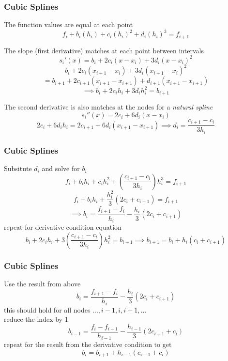 \documentclass[fleqn]{beamer} %
\newcommand{\sectionIIIsubsectionIVtitle}{Cubic Splines}
\begin{document}
			\begin{frame}
				\frametitle{\sectionIIIsubsectionIVtitle} \small
				\bigskip
        
        The function values are equal at each point
        \[f_i+b_i\left(h_i\right)+c_i\left(h_i\right)^2+d_i\left(h_i\right)^3=f_{i+1}\]
      
        The slope (first derivative) matches at each point between intervals 
        \[s_i'\left(x\right)=b_i+2c_i\left(x-x_i\right)+3d_i\left(x-x_i\right)^2\]
        \[b_i+2c_i\left(x_{i+1}-x_i\right)+3d_i\left(x_{i+1}-x_i\right)^2\]
        \[= b_{i+1}+2c_{i+1}\left(x_{i+1}-x_{i+1}\right)+d_{i+1}\left(x_{i+1}-x_{i+1}\right)\] 
        \[\implies b_i+2c_ih_i+3d_ih_i^2=b_{i+1}\]
  
        The second derivative is also matches at the nodes for a {\it natural spline} 
        \[s_i''\left(x\right)=2c_i+6d_i\left(x-x_i\right)\]
        \[2c_i + 6d_ih_i=2c_{i+1} + 6d_i\left(x_{i+1}-x_{i+1}\right) \implies d_i=\frac{c_{i+1}-c_i}{3h_i}\]

        \btVFill
			\end{frame}	
	
			\begin{frame}
				\frametitle{\sectionIIIsubsectionIVtitle} \small
				\bigskip
        Subsitute $d_i$ and solve for $b_i$ 
        \[f_i+b_ih_i+c_ih_i^2+\left(\frac{c_{i+1}-c_i}{3h_i}\right)h_i^3=f_{i+1}\]
        \[f_i+b_ih_i+\frac{h_i^2}{3}\left(2c_i+c_{i+1}\right)=f_{i+1}\]
        \[\implies b_i=\frac{f_{i+1}-f_i}{h_i}-\frac{h_i}{3}\left(2c_i+c_{i+1}\right)\]
        repeat for derivative condition equation
        \[b_i+2c_ih_i+3\left(\frac{c_{i+1}-c_i}{3h_i}\right)h_i^2=b_{i+1}\implies b_{i+1}=b_i+h_i\left(c_i+c_{i+1}\right)\]

				\btVFill
			\end{frame}	

			\begin{frame}
				\frametitle{\sectionIIIsubsectionIVtitle} \small
				\bigskip
        Use the result from above
        \[b_i=\frac{f_{i+1}-f_i}{h_i}-\frac{h_i}{3}\left(2c_i+c_{i+1}\right)\]
        this should hold for all nodes $...,i-1, i, i+1,...$ \\
        reduce the index by 1
        \[b_{i-1}=\frac{f_i-f_{i-1}}{h_{i-1}}-\frac{h_{i-1}}{3}\left(2c_{i-1}+c_i\right)\]
        repeat for the result from the derivative condition to get
        \[b_i=b_{i+1}+h_{i-1}\left(c_{i-1}+c_i\right)\] 
				\btVFill
			\end{frame}	
			
\end{document}
